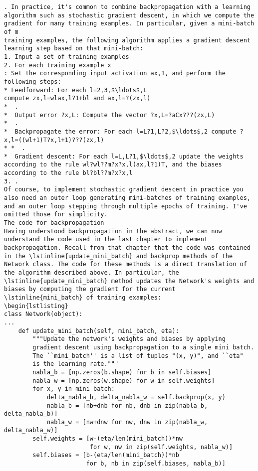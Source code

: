 \begin{lstlisting}
. In practice, it's common to combine backpropagation with a learning algorithm such as stochastic gradient descent, in which we compute the gradient for many training examples. In particular, given a mini-batch of m
training examples, the following algorithm applies a gradient descent learning step based on that mini-batch: 
1. Input a set of training examples
2. For each training example x
: Set the corresponding input activation ax,1, and perform the following steps:
* Feedforward: For each l=2,3,$\ldots$,L
compute zx,l=wlax,l?1+bl and ax,l=?(zx,l)
*  .
*  Output error ?x,L: Compute the vector ?x,L=?aCx???(zx,L)
*  .
*  Backpropagate the error: For each l=L?1,L?2,$\ldots$,2 compute ?x,l=((wl+1)T?x,l+1)???(zx,l)
* *  . 
*  Gradient descent: For each l=L,L?1,$\ldots$,2 update the weights according to the rule wl?wl??m?x?x,l(ax,l?1)T, and the biases according to the rule bl?bl??m?x?x,l
3. .
Of course, to implement stochastic gradient descent in practice you also need an outer loop generating mini-batches of training examples, and an outer loop stepping through multiple epochs of training. I've omitted those for simplicity. 
The code for backpropagation
Having understood backpropagation in the abstract, we can now understand the code used in the last chapter to implement backpropagation. Recall from that chapter that the code was contained in the \lstinline{update_mini_batch} and backprop methods of the Network class. The code for these methods is a direct translation of the algorithm described above. In particular, the \lstinline{update_mini_batch} method updates the Network's weights and biases by computing the gradient for the current \lstinline{mini_batch} of training examples: 
\begin{lstlisting}
class Network(object):
...
    def update_mini_batch(self, mini_batch, eta):
        """Update the network's weights and biases by applying
        gradient descent using backpropagation to a single mini batch.
        The ``mini_batch'' is a list of tuples "(x, y)", and ``eta"
        is the learning rate."""
        nabla_b = [np.zeros(b.shape) for b in self.biases]
        nabla_w = [np.zeros(w.shape) for w in self.weights]
        for x, y in mini_batch:
            delta_nabla_b, delta_nabla_w = self.backprop(x, y)
            nabla_b = [nb+dnb for nb, dnb in zip(nabla_b, delta_nabla_b)]
            nabla_w = [nw+dnw for nw, dnw in zip(nabla_w, delta_nabla_w)]
        self.weights = [w-(eta/len(mini_batch))*nw 
                        for w, nw in zip(self.weights, nabla_w)]
        self.biases = [b-(eta/len(mini_batch))*nb 
                       for b, nb in zip(self.biases, nabla_b)]
\end{lstlisting}


